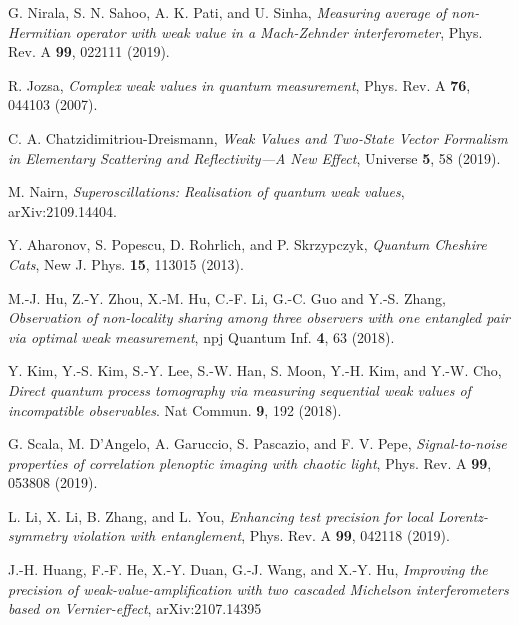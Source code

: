 \documentclass[aps,pra,showpacs,twoside,twocolumn,10pt]{revtex4-1}
\begin{document}
\begin{thebibliography}{100}
 G. Nirala, S. N. Sahoo, A. K. Pati, and U. Sinha, \textit{Measuring average of non-Hermitian operator with weak value in a Mach-Zehnder interferometer}, Phys. Rev. A \textbf{99}, 022111 (2019).

 R. Jozsa, \textit{Complex weak values in quantum measurement}, Phys. Rev. A \textbf{76}, 044103 (2007).

 C. A. Chatzidimitriou-Dreismann, \textit{Weak Values and Two-State Vector Formalism in Elementary Scattering and Reflectivity—A New Effect}, Universe \textbf{5}, 58 (2019).

 M. Nairn, \textit{Superoscillations: Realisation of quantum weak values},	arXiv:2109.14404.













 Y. Aharonov, S. Popescu, D. Rohrlich, and P. Skrzypczyk, \textit{Quantum Cheshire Cats}, New J. Phys. \textbf{15}, 113015 (2013).

 M.-J. Hu, Z.-Y. Zhou, X.-M. Hu, C.-F. Li, G.-C. Guo and Y.-S. Zhang, \textit{Observation of non-locality sharing among three observers
with one entangled pair via optimal weak measurement}, npj Quantum Inf. \textbf{4}, 63 (2018).

 Y. Kim, Y.-S. Kim, S.-Y. Lee, S.-W. Han, S. Moon, Y.-H. Kim,  and Y.-W. Cho, \textit{Direct quantum process tomography via measuring sequential weak values of incompatible observables}. Nat Commun. \textbf{9}, 192 (2018).



 G. Scala, M. D'Angelo, A. Garuccio, S. Pascazio, and F. V. Pepe, \textit{Signal-to-noise properties of correlation plenoptic imaging with chaotic light}, Phys. Rev. A \textbf{99}, 053808 (2019).

 L. Li, X. Li, B. Zhang, and L. You, \textit{Enhancing test precision for local Lorentz-symmetry violation with entanglement}, Phys. Rev. A \textbf{99}, 042118 (2019).

 J.-H. Huang, F.-F. He, X.-Y. Duan, G.-J. Wang, and X.-Y. Hu, \textit{Improving the precision of weak-value-amplification with two cascaded Michelson interferometers based on Vernier-effect}, arXiv:2107.14395 %


\end{thebibliography}
\end{document}
